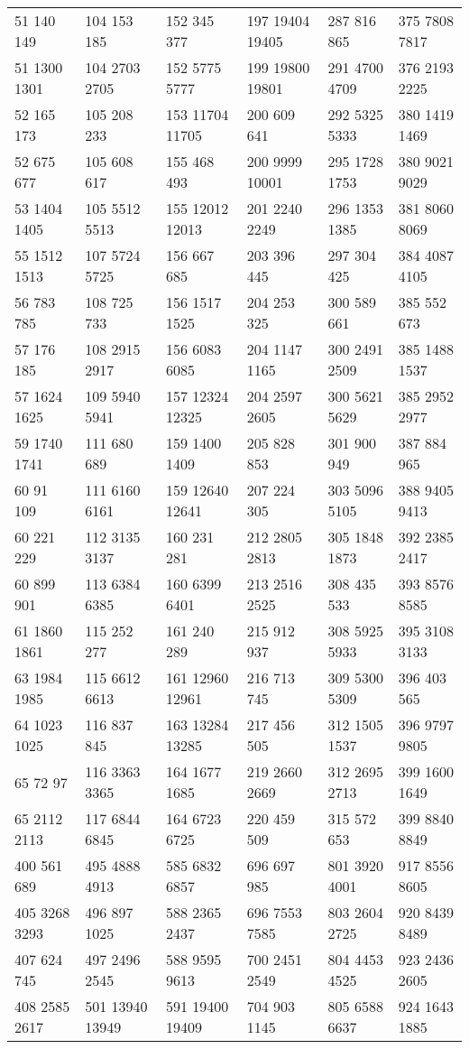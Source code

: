 \begin{center}
\begin{longtable}{llllll}
51 140 149&104 153 185&152 345 377&197 19404 19405&287 816 865&375 7808 7817\\
51 1300 1301&104 2703 2705&152 5775 5777&199 19800 19801&291 4700 4709&376 2193 2225\\
52 165 173&105 208 233&153 11704 11705&200 609 641&292 5325 5333&380 1419 1469\\
52 675 677&105 608 617&155 468 493&200 9999 10001&295 1728 1753&380 9021 9029\\
53 1404 1405&105 5512 5513&155 12012 12013&201 2240 2249&296 1353 1385&381 8060 8069\\
55 1512 1513&107 5724 5725&156 667 685&203 396 445&297 304 425&384 4087 4105\\
56 783 785&108 725 733&156 1517 1525&204 253 325&300 589 661&385 552 673\\
57 176 185&108 2915 2917&156 6083 6085&204 1147 1165&300 2491 2509&385 1488 1537\\
57 1624 1625&109 5940 5941&157 12324 12325&204 2597 2605&300 5621 5629&385 2952 2977\\
59 1740 1741&111 680 689&159 1400 1409&205 828 853&301 900 949&387 884 965\\
60 91 109&111 6160 6161&159 12640 12641&207 224 305&303 5096 5105&388 9405 9413\\
60 221 229&112 3135 3137&160 231 281&212 2805 2813&305 1848 1873&392 2385 2417\\
60 899 901&113 6384 6385&160 6399 6401&213 2516 2525&308 435 533&393 8576 8585\\
61 1860 1861&115 252 277&161 240 289&215 912 937&308 5925 5933&395 3108 3133\\
63 1984 1985&115 6612 6613&161 12960 12961&216 713 745&309 5300 5309&396 403 565\\
64 1023 1025&116 837 845&163 13284 13285&217 456 505&312 1505 1537&396 9797 9805\\
65 72 97&116 3363 3365&164 1677 1685&219 2660 2669&312 2695 2713&399 1600 1649\\
65 2112 2113&117 6844 6845&164 6723 6725&220 459 509&315 572 653&399 8840 8849\\
400 561 689&495 4888 4913&585 6832 6857&696 697 985&801 3920 4001&917 8556 8605\\
405 3268 3293&496 897 1025&588 2365 2437&696 7553 7585&803 2604 2725&920 8439 8489\\
407 624 745&497 2496 2545&588 9595 9613&700 2451 2549&804 4453 4525&923 2436 2605\\
408 2585 2617&501 13940 13949&591 19400 19409&704 903 1145&805 6588 6637&924 1643 1885\\

\end{longtable}
\end{center}
